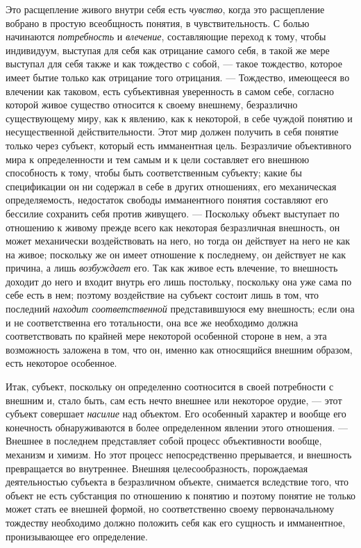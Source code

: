 \documentclass[twoside]{article}
\begin{document}
{{{Это расщепление живого внутри себя есть
{\em чувство}, когда это
расщепление вобрано в простую всеобщность понятия, в чувствительность. С
болью начинаются {\em потребность}
и {\em влечение},
составляющие переход к тому, чтобы индивидуум, выступая для
себя как отрицание самого себя, в такой же мере выступал для себя также и
как тождество с собой, — такое тождество, которое имеет
бытие только как отрицание того отрицания. — Тождество,
имеющееся во влечении как таковом, есть субъективная уверенность в самом
себе, согласно которой живое существо относится к своему внешнему,
безразлично существующему миру, как к явлению, как к некоторой, в себе
чуждой понятию и несущественной действительности. Этот мир
должен получить в себя понятие только через субъект, который
есть имманентная цель. Безразличие объективного мира к определенности и тем
самым и к цели составляет его внешнюю способность к тому, чтобы быть
соответственным субъекту; какие бы спецификации он ни содержал в себе в
других отношениях, его механическая определяемость, недостаток свободы
имманентного понятия составляют его бессилие сохранить себя против
живущего. — Поскольку объект выступает по отношению к живому
прежде всего как некоторая безразличная внешность, он может механически
воздействовать на него, но тогда он действует на него не как на живое;
поскольку же он имеет отношение к последнему, он действует не как причина,
а лишь {\em возбуждает}
его. Так как живое есть влечение, то внешность доходит до
него и входит внутрь его лишь постольку, поскольку она уже сама по себе
есть в нем; поэтому воздействие на субъект состоит лишь в том, что
последний {\em находит соответственной}
представившуюся ему внешность; если она и не соответственна
его тотальности, она все же необходимо должна соответствовать по крайней
мере некоторой особенной стороне в нем, а эта возможность заложена в том,
что он, именно как относящийся внешним образом, есть некоторое особенное.

Итак, субъект, поскольку он определенно соотносится в своей
потребности с внешним и, стало быть, сам есть нечто внешнее или некоторое
орудие, — этот субъект совершает
{\em насилие} над
объектом. Его особенный характер и вообще его конечность обнаруживаются в
более определенном явлении этого отношения. — Внешнее в
последнем представляет собой процесс объективности вообще, механизм и
химизм. Но этот процесс непосредственно прерывается, и внешность
превращается во внутреннее. Внешняя целесообразность, порождаемая
деятельностью субъекта в безразличном объекте, снимается вследствие того,
что объект не есть субстанция по отношению к понятию и поэтому понятие не
только может стать ее внешней формой, но соответственно своему
первоначальному тождеству необходимо должно положить себя как его сущность
и имманентное, пронизывающее его определение.

}}}
\end{document}
